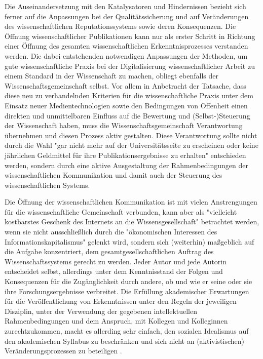 Die Auseinandersetzung mit den Katalysatoren und Hindernissen bezieht sich ferner auf die Anpassungen bei der Qualitätssicherung und auf Veränderungen des wissenschaftlichen Reputationssystems sowie deren Konsequenzen. Die Öffnung wissenschaftlicher Publikationen kann nur als erster Schritt in Richtung einer Öffnung des gesamten wissenschaftlichen Erkenntnisprozesses verstanden werden. Die dabei entstehenden notwendigen Anpassungen der Methoden, um gute wissenschaftliche Praxis bei der Digitalisierung wissenschaftlicher Arbeit zu einem Standard in der Wissenschaft zu machen, obliegt ebenfalls der Wissenschaftsgemeinschaft selbst. Vor allem in Anbetracht der Tatsache, dass diese neu zu verhandelnden Kriterien für die wissenschaftliche Praxis unter dem Einsatz neuer Medientechnologien sowie den Bedingungen von Offenheit einen direkten und unmittelbaren Einfluss auf die Bewertung und (Selbst-)Steuerung der Wissenschaft haben, muss die Wissenschaftsgemeinschaft Verantwortung übernehmen und diesen Prozess aktiv gestalten. Diese Verantwortung sollte nicht durch die Wahl "gar nicht mehr auf der Universitätsseite zu erscheinen oder keine jährlichen Geldmittel für ihre Publikationsergebnisse zu erhalten" \cite{Warnke_2012} entschieden werden, sondern durch eine aktive Ausgestaltung der Rahmenbedingungen der wissenschaftlichen Kommunikation und damit auch der Steuerung des wissenschaftlichen Systems.

Die Öffnung der wissenschaftlichen Kommunikation ist mit vielen Anstrengungen für die wissenschaftliche Gemeinschaft verbunden, kann aber als "vielleicht kostbarstes Geschenk des Internets an die Wissensgesellschaft" betrachtet werden, wenn sie nicht ausschließlich durch die "ökonomischen Interessen des Informationskapitalismus" \cite{hagner_2015_sache_buches} gelenkt wird, sondern sich (weiterhin) maßgeblich auf die Aufgabe konzentriert, dem gesamtgesellschaftlichen Auftrag des Wissenschaftssystems gerecht zu werden. Jeder Autor und jede Autorin entscheidet selbst, allerdings unter dem Kenntnisstand der Folgen und Konsequenzen für die Zugänglichkeit durch andere, ob und wie er seine oder sie ihre Forschungsergebnisse verbreitet. Die Erfüllung akademischer Erwartungen für die Veröffentlichung von Erkenntnissen unter den Regeln der jeweiligen Disziplin, unter der Verwendung der gegebenen intellektuellen Rahmenbedingungen und dem Anspruch, mit Kollegen und Kolleginnen zurechtzukommen, macht es allerding sehr einfach, den sozialen Idealismus auf den akademischen Syllabus zu beschränken und sich nicht an (aktivistischen) Veränderungsprozessen zu beteiligen \cite[:25]{Flood_2013}.

